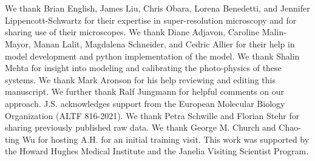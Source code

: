 \section{}
We thank Brian English, James Liu, Chris Obara, Lorena Benedetti, and Jennifer Lippencott-Schwartz for their expertise in
    super-resolution microscopy and for sharing use of their microscopes. 
    We thank Diane Adjavon, Caroline Malin-Mayor, Manan Lalit, Magdalena Schneider, and Cedric Allier 
    for their help in model development and python implementation of the model. 
    We thank Shalin Mehta for insight into modeling and calibrating the photo-physics of these systems.
    We thank Mark Aronson for his help reviewing and editing this manuscript. 
    We further thank Ralf Jungmann for helpful comments on our approach.
    J.S. acknowledges support from the European Molecular Biology Organization (ALTF 816-2021). 
    We thank Petra Schwille and Florian Stehr for sharing previously published raw data. 
    We thank George M. Church and Chao-ting Wu for hosting A.H. for an initial training visit.
    This work was supported by the Howard Hughes Medical Institute and the Janelia Visiting Scientist Program.
